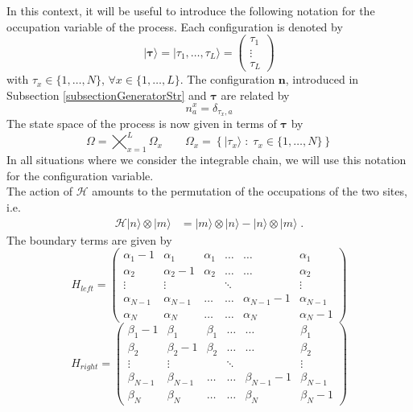 \documentclass[10pt]{article}
\numberwithin{equation}{section}
\numberwithin{equation}{subsection}
\newcommand{\dt}{\;.}
\begin{document}
 In this context, it will be useful to introduce the following notation for the occupation variable of the process. Each configuration is denoted by
\begin{equation}\label{Tau-Notation}
	|\bm{\tau}\rangle=|\tau_{1},\ldots,\tau_{L}\rangle =\begin{pmatrix}
		\tau_{1}\\
		\vdots\\
		\tau_{L}
	\end{pmatrix}
\end{equation} 
with $\tau_{x}\in \{1,\ldots,N\}$, $\forall x\in \{1,\ldots,L\}$. The configuration $\bm{n}$, introduced in Subsection \ref{subsectionGeneratorStr} and $\bm{\tau}$ are related by 
\begin{equation}\label{notation-change-relation}
	n_{a}^{x}=\delta_{\tau_{x},a}
\end{equation}
The state space of the process is now given in terms of $\bm{\tau}$ by
\begin{equation}
	\Omega=\bigtimes_{x=1}^{L}\Omega_{x}\qquad \Omega_{x}=\left\{|\tau_{x}\rangle\;:\; \tau_{x}\in\{1,\ldots,N\}\right\}
\end{equation}
In all situations where we consider the integrable chain, we will use this notation for the configuration variable.\\ 
The action of $\mathcal{H}$ amounts to the permutation of the occupations of the two sites, i.e.
\begin{equation}
	\begin{split}
		\mathcal{H}|n\rangle\otimes   |m\rangle&=|m\rangle \otimes |n\rangle-|n\rangle \otimes|m\rangle\dt
	\end{split}
\end{equation}
The boundary terms are given by 
\begin{equation}
	H_{left}=\begin{pmatrix}
		\alpha_{1}-1&\alpha_{1}&\alpha_{1}&\ldots&\ldots&\alpha_{1}\\
		\alpha_{2}&\alpha_{2}-1&\alpha_{2}&\ldots&\ldots&\alpha_{2}\\
		\vdots&\vdots& &\ddots& &\vdots\\
		\alpha_{N-1}&\alpha_{N-1}&\ldots&\ldots&\alpha_{N-1}-1&\alpha_{N-1}\\
		\alpha_{N}&\alpha_{N}&\ldots&\ldots&\alpha_{N}&\alpha_{N}-1
	\end{pmatrix}
\end{equation}
\begin{equation}
	H_{right}=\begin{pmatrix}
		\beta_{1}-1&\beta_{1}&\beta_{1}&\ldots&\ldots&\beta_{1}\\
		\beta_{2}&\beta_{2}-1&\beta_{2}&\ldots&\ldots&\beta_{2}\\
		\vdots&\vdots& &\ddots& &\vdots\\
		\beta_{N-1}&\beta_{N-1}&\ldots&\ldots&\beta_{N-1}-1&\beta_{N-1}\\
		\beta_{N}&\beta_{N}&\ldots&\ldots&\beta_{N}&\beta_{N}-1
	\end{pmatrix}
\end{equation}
\end{document}
